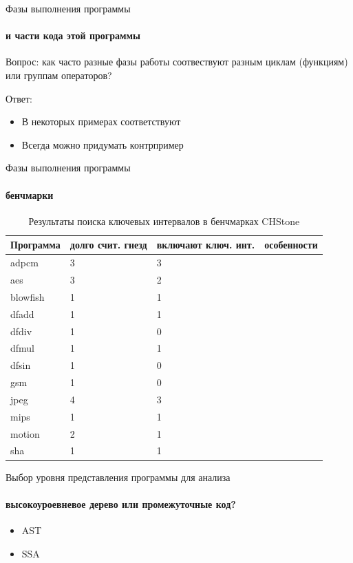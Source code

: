 \documentclass{beamer}              %
\begin{document}
\begin{frame}{Фазы выполнения программы}
  \framesubtitle{и части кода этой программы}
  Вопрос: как часто разные фазы работы соотвествуют разным циклам (функциям) или группам операторов?
  
  Ответ: 
  \begin{itemize}
      \item В некоторых примерах соответствуют
      \item Всегда можно придумать контрпример
  \end{itemize}
  
\end{frame}

\begin{frame}{Фазы выполнения программы}
  \framesubtitle{бенчмарки}
  \begin{table}
    \begin{tabular}{ | p{1.5cm} | p{2cm} | p{1cm} | p{6cm} |}
    \hline
    Программа & долго счит. гнезд & включают ключ. инт. & особенности \\ \hline
    adpcm & 3 & 3 &  \\ \hline
    aes & 3 & 2 &  \\ \hline
    blowfish & 1 & 1 &  \\ \hline
    dfadd & 1 & 1 &  \\ \hline
    dfdiv & 1 & 0 &  \\ \hline
    dfmul & 1 & 1 &  \\ \hline
    dfsin & 1 & 0 &  \\ \hline
    gsm & 1 & 0 &  \\ \hline
    jpeg & 4 & 3 & \\ \hline
    mips & 1 & 1 & \\ \hline
    motion & 2 & 1 &  \\ \hline
    sha & 1 & 1 &  \\ \hline
    \end{tabular} 
    \caption{Результаты поиска ключевых интервалов в бенчмарках CHStone}
    \label{table:CHStoneSimpoints}
\end{table}

\end{frame}

\begin{frame}{Выбор уровня представления программы для анализа}
  \framesubtitle{высокоуроевневое дерево или промежуточные код?}
  
  \begin{itemize}
      \item AST
      \item SSA
  \end{itemize}
  
\end{frame}
\end{document}
